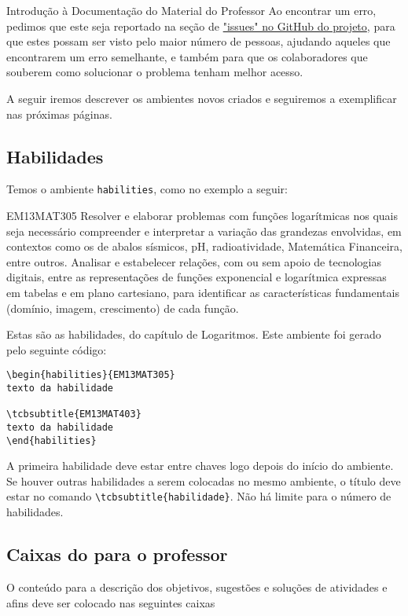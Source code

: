 \begin{apresentacao}{Introdução à Documentação do Material do Professor}
Ao encontrar um erro, pedimos que este seja reportado na seção de \href{https://github.com/livro-aberto/tex-design-development/issues}{"issues"{} no GitHub do projeto}, para que estes possam ser visto pelo maior número de pessoas, ajudando aqueles que encontrarem um erro semelhante, e também para que os colaboradores que souberem como solucionar o problema tenham melhor acesso.

A seguir iremos descrever os ambientes novos criados e seguiremos a exemplificar nas próximas páginas.

\subsection{Habilidades}
Temos o ambiente \verb|habilities|, como no exemplo a seguir:

\begin{habilities}{EM13MAT305}
Resolver e elaborar problemas com funções logarítmicas nos quais seja necessário compreender e interpretar a variação das grandezas envolvidas, em contextos como os de abalos sísmicos, pH, radioatividade, Matemática Financeira, entre outros.
Analisar e estabelecer relações, com ou sem apoio de tecnologias digitais, entre as representações de funções exponencial e logarítmica expressas em tabelas e em plano cartesiano, para identificar as características fundamentais (domínio, imagem, crescimento) de cada função.
\end{habilities}

Estas são as habilidades, do capítulo de Logaritmos. Este ambiente foi gerado pelo seguinte código:
\begin{verbatim}
\begin{habilities}{EM13MAT305}
texto da habilidade

\tcbsubtitle{EM13MAT403}
texto da habilidade
\end{habilities}
\end{verbatim}

A primeira habilidade deve estar entre chaves logo depois do início do ambiente. Se houver outras habilidades a serem colocadas no mesmo ambiente, o título deve estar no comando \verb|\tcbsubtitle{habilidade}|. Não há limite para o número de habilidades.

\subsection{Caixas do para o professor}

O conteúdo para a descrição dos objetivos, sugestões e soluções de atividades e afins deve ser colocado nas seguintes caixas


\end{apresentacao}

